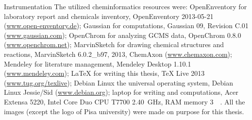 \begin{section}{Instrumentation}
The utilized chem\-informatics resources were: OpenEnventory for laboratory report and chemicals inventory, OpenEnventory 2013-05-21 (\url{www.open-enventory.de}); Gaussian for computations, Gaussian 09, Revision C.01 (\url{www.gaussian.com}); OpenChrom for analyzing \gls{GCMS} data, OpenChrom 0.8.0 (\url{www.openchrom.net}); MarvinSketch for drawing chemical structures and reactions, MarvinSketch 6.0.2\_b97, 2013, ChemAxon (\url{www.chemaxon.com}); Mendeley for literature management, Mendeley Desktop 1.10.1 (\url{www.mendeley.com}); {\LaTeX} for writing this thesis, TeX Live 2013 (\url{www.tug.org/texlive}); Debian Linux the universal operating system, Debian Linux Jessie/Sid (\url{www.debian.org}); laptop for writing and computations, Acer Extensa 5220, Intel\textsuperscript{\textregistered} Core Duo CPU T7700 \SI{2.40}{\GHz}, RAM memory \SI{3}{\gibi\byte}. All the images (except the logo of Pisa university) were made on purpose for this thesis.

\end{section}
\clearpage
